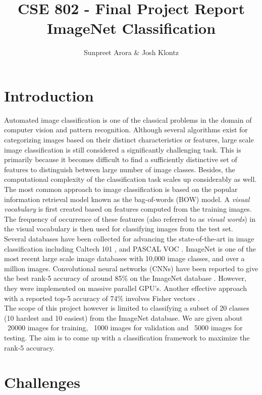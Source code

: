 \documentclass[12pt]{article}
\begin{document}
 
\title{CSE 802 - Final Project Report\\ ImageNet Classification}
\author{Sunpreet Arora \& Josh Klontz\\
}
 
\maketitle

\section{Introduction}
Automated image classification is one of the classical problems in the domain of computer vision and pattern recognition. Although several algorithms exist for categorizing images based on their distinct characteristics or features, large scale image classification is still considered a significantly challenging task. This is primarily because it becomes difficult to find a sufficiently distinctive set of features to distinguish between large number of image classes. Besides, the computational complexity of the classification task scales up considerably as well.\\
The most common approach to image classification is based on the popular information retrieval model known as the bag-of-words (BOW) model. A \textit{visual vocabulary} is first created based on features computed from the training images. The frequency of occurrence of these features (also referred to as \textit{visual words}) in the visual vocabulary is then used for classifying images from the test set.\\
Several databases have been collected for advancing the state-of-the-art in image classification including Caltech 101 \cite{caltech101}, and PASCAL VOC \cite{pascal09}. ImageNet \cite{imagenet} is one of the most recent large scale image databases with 10,000 image classes, and over a million images. Convolutional neural networks (CNNs) have been reported to give the best rank-5 accuracy of around 85\% on the ImageNet database \cite{alex2012}. However, they were implemented on massive parallel GPU's. Another effective approach with a reported top-5 accuracy of 74\% involves Fisher vectors \cite{csurka2011fisher}.\\
The scope of this project however is limited to classifying a subset of 20 classes (10 hardest and 10 easiest) from the ImageNet database. We are given about ~20000 images for training, ~1000 images for validation and ~5000 images for testing. The aim is to come up with a classification framework to maximize the rank-5 accuracy.

\section{Challenges}





\end{document}
